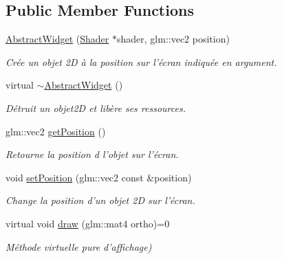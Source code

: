 \subsection*{Public Member Functions}
\begin{DoxyCompactItemize}
\item 
\hypertarget{classAbstractWidget_a385f0b11064be82084e3141602a2962e}{\hyperlink{classAbstractWidget_a385f0b11064be82084e3141602a2962e}{Abstract\+Widget} (\hyperlink{classShader}{Shader} $\ast$shader, glm\+::vec2 position)}\label{classAbstractWidget_a385f0b11064be82084e3141602a2962e}

\begin{DoxyCompactList}\small\item\em Crée un objet 2\+D à la position sur l'écran indiquée en argument. \end{DoxyCompactList}\item 
\hypertarget{classAbstractWidget_ace1ce0f76aeb82b810a0ac50059a0e59}{virtual \hyperlink{classAbstractWidget_ace1ce0f76aeb82b810a0ac50059a0e59}{$\sim$\+Abstract\+Widget} ()}\label{classAbstractWidget_ace1ce0f76aeb82b810a0ac50059a0e59}

\begin{DoxyCompactList}\small\item\em Détruit un objet2\+D et libère ses ressources. \end{DoxyCompactList}\item 
\hypertarget{classAbstractWidget_a1ad11e1303e1f73f77726a24167f943f}{glm\+::vec2 \hyperlink{classAbstractWidget_a1ad11e1303e1f73f77726a24167f943f}{get\+Position} ()}\label{classAbstractWidget_a1ad11e1303e1f73f77726a24167f943f}

\begin{DoxyCompactList}\small\item\em Retourne la position d l'objet sur l'écran. \end{DoxyCompactList}\item 
\hypertarget{classAbstractWidget_acc96658ec6504098e7e9cadcc78c3197}{void \hyperlink{classAbstractWidget_acc96658ec6504098e7e9cadcc78c3197}{set\+Position} (glm\+::vec2 const \&position)}\label{classAbstractWidget_acc96658ec6504098e7e9cadcc78c3197}

\begin{DoxyCompactList}\small\item\em Change la position d'un objet 2\+D sur l'écran. \end{DoxyCompactList}\item 
\hypertarget{classAbstractWidget_aa4fcf0bffd64956bda11ee5302641def}{virtual void \hyperlink{classAbstractWidget_aa4fcf0bffd64956bda11ee5302641def}{draw} (glm\+::mat4 ortho)=0}\label{classAbstractWidget_aa4fcf0bffd64956bda11ee5302641def}

\begin{DoxyCompactList}\small\item\em Méthode virtuelle pure d'affichage) \end{DoxyCompactList}\end{DoxyCompactItemize}
